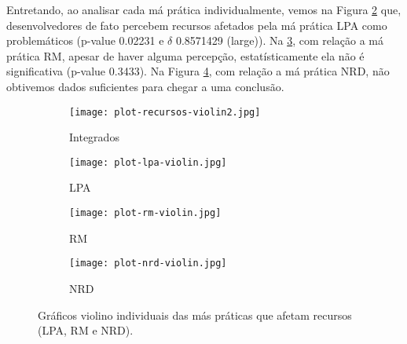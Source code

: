 Entretando, ao analisar cada má prática individualmente, vemos na Figura \ref{fig:lpa} que, desenvolvedores de fato percebem recursos afetados pela má prática LPA como problemáticos (p-value 0.02231 e $\delta$ 0.8571429 (large)). Na \ref{fig:rm}, com relação a má prática RM, apesar de haver alguma percepção, estatísticamente ela não é significativa (p-value 0.3433). Na Figura \ref{fig:nrd}, com relação a má prática NRD, não obtivemos dados suficientes para chegar a uma conclusão. 

\begin{figure*}
\centering
\begin{subfigure}{.23\textwidth}
  \centering
  \texttt{[image: plot-recursos-violin2.jpg]}
  \caption{Integrados}
  \label{fig:resources}
\end{subfigure}%
\begin{subfigure}{.23\textwidth}
  \centering
  \texttt{[image: plot-lpa-violin.jpg]}
  \caption{LPA}
  \label{fig:lpa}
\end{subfigure}%
\begin{subfigure}{.23\textwidth}
  \centering
  \texttt{[image: plot-rm-violin.jpg]}
  \caption{RM}
  \label{fig:rm}
\end{subfigure}
\begin{subfigure}{.23\textwidth}
  \centering
  \texttt{[image: plot-nrd-violin.jpg]}
  \caption{NRD}
  \label{fig:nrd}
\end{subfigure}%
\caption{Gráficos violino individuais das más práticas que afetam recursos (LPA, RM e NRD).}
\label{fig:all-resources}
\end{figure*}











